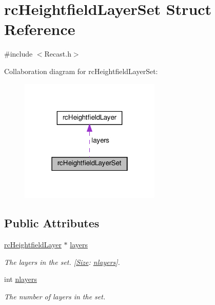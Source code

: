 \hypertarget{structrcHeightfieldLayerSet}{}\section{rc\+Heightfield\+Layer\+Set Struct Reference}
\label{structrcHeightfieldLayerSet}


{\ttfamily \#include $<$Recast.\+h$>$}



Collaboration diagram for rc\+Heightfield\+Layer\+Set\+:
\nopagebreak
\begin{figure}[H]
\begin{center}
\leavevmode
\includegraphics[width=190pt]{structrcHeightfieldLayerSet__coll__graph}
\end{center}
\end{figure}
\subsection*{Public Attributes}
\begin{DoxyCompactItemize}
\item 
\mbox{\label{structrcHeightfieldLayerSet_a5a3e1a947c696facc11df6609006eba3}} 
\hyperlink{structrcHeightfieldLayer}{rc\+Heightfield\+Layer} $\ast$ \hyperlink{structrcHeightfieldLayerSet_a5a3e1a947c696facc11df6609006eba3}{layers}
\begin{DoxyCompactList}\small\item\em The layers in the set. \mbox{[}\hyperlink{classSize}{Size}\+: \hyperlink{structrcHeightfieldLayerSet_aee43327ad152d5dea25ed5299f38101a}{nlayers}\mbox{]}. \end{DoxyCompactList}\item 
\mbox{\label{structrcHeightfieldLayerSet_aee43327ad152d5dea25ed5299f38101a}} 
int \hyperlink{structrcHeightfieldLayerSet_aee43327ad152d5dea25ed5299f38101a}{nlayers}
\begin{DoxyCompactList}\small\item\em The number of layers in the set. \end{DoxyCompactList}\end{DoxyCompactItemize}


